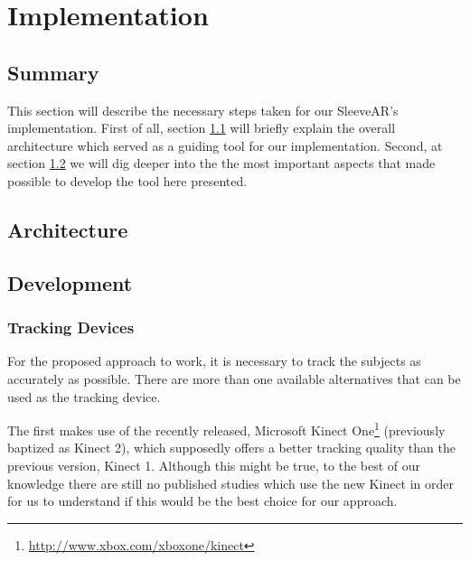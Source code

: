 \chapter{Implementation}
\label{sec:implementation}

\section*{Summary}

This section will describe the necessary steps taken for our SleeveAR's implementation. 
First of all, section \ref{sec:impl:arch} will briefly explain the overall architecture which served as a guiding tool for our implementation. 
Second, at section \ref{sec:impl:dev} we will dig deeper into the the most important aspects that made possible to develop the tool here presented.

\section{Architecture}
\label{sec:impl:arch}


\section{Development}
\label{sec:impl:dev}




\subsection{Tracking Devices}

For the proposed approach to work, it is necessary to track the subjects as accurately as possible. There are more than one available alternatives that can be used as the tracking device.

The first makes use of the recently released, Microsoft Kinect One\footnote{\url{http://www.xbox.com/xboxone/kinect}} 
(previously baptized as Kinect 2), which supposedly offers a better tracking quality than 
the previous version, Kinect 1. Although this might be true, to the best of our knowledge there are still no published studies which use the new Kinect in order for us to understand if this would be the best choice for our approach.

